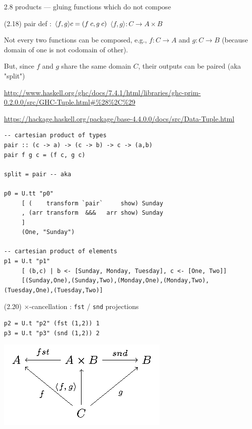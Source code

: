 \documentclass[presentation]{beamer}
\begin{document}
\begin{frame}[fragile,label=sec-7]{2.8 products --- gluing functions which do not compose}
 \begin{block}{(2.18) pair def : $\langle f,g \rangle c = (f \hspace{0.25em} c, g \hspace{0.25em} c)$}
$\langle f,g \rangle : C \rightarrow A \times B$

Not every two functions can be composed, e.g., $f : C \rightarrow A$
and $g : C \rightarrow B$ (because domain of one is not codomain of other).

But, since $f$ and $g$ share the same domain $C$, their outputs can be paired (aka "split")

\url{http://www.haskell.org/ghc/docs/7.4.1/html/libraries/ghc-prim-0.2.0.0/src/GHC-Tuple.html#\%28\%2C\%29}

\url{https://hackage.haskell.org/package/base-4.4.0.0/docs/src/Data-Tuple.html}

\begin{verbatim}
-- cartesian product of types
pair :: (c -> a) -> (c -> b) -> c -> (a,b)
pair f g c = (f c, g c)

split = pair -- aka

p0 = U.tt "p0"
     [ (    transform `pair`     show) Sunday
     , (arr transform  &&&   arr show) Sunday
     ]
     (One, "Sunday")

-- cartesian product of elements
p1 = U.t "p1"
     [ (b,c) | b <- [Sunday, Monday, Tuesday], c <- [One, Two]]
     [(Sunday,One),(Sunday,Two),(Monday,One),(Monday,Two),(Tuesday,One),(Tuesday,Two)]
\end{verbatim}
\end{block}

\begin{block}{(2.20) $\times$-cancellation : \texttt{fst} / \texttt{snd} projections}
\begin{verbatim}
p2 = U.t "p2" (fst (1,2)) 1
p3 = U.t "p3" (snd (1,2)) 2
\end{verbatim}

\includegraphics[width=.9\linewidth]{./pair.png}
\end{block}


\end{frame}
\end{document}
